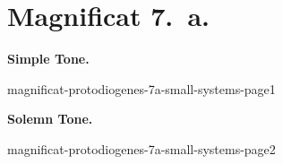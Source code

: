 {
\cleartoleftpage{}
\thispagestyle{empty}
\newcommand{\printsimpletone}{
\needspace{3\baselineskip}
\begin{center}\textbf{Simple Tone.}\end{center}
\vspace{0ex plus 0ex minus 2ex}
}
\newcommand{\printsolemntone}{
\needspace{3\baselineskip}
\begin{center}\textbf{Solemn Tone.}\end{center}
\vspace{0ex plus 0ex minus 1ex}
}

\label{magnificat-7a}
\vspace*{-\headheight}
\vspace*{-0.5\baselineskip}
\section{Magnificat 7.~a.}

\vspace{-\baselineskip}
\def\betweenLilyPondSystem#1{
  \ifnum#1>1
    \vfil\noindent
  \else
    \linebreak
  \fi
}
\newcommand{\includelilypond}[1]{
  \noindent
  {#1}
}
\def\magsolemn{F}
\def\magprotodiogenes{T}
\def\annot{\magtone.~\magend}
\def\greinitialformat#1{%
{\fontsize{50}{50}\selectfont #1}%
}
\printsimpletone{}
\begin{boldnummagnificat}{\magtex}
\magverses
\end{boldnummagnificat}


\vfill
\includelilypond{magnificat-protodiogenes-7a-small-systems-page1}
\pagebreak


\def\magsolemn{T}
\let\magant=\undefined
\let\magantlinetwo=\undefined
\let\magtex=\undefined
\let\magverses=\undefined
\def\magprotodiogenes{T}
\def\annot{\magtone.~\magend}
\printsolemntone{}
\begin{boldnummagnificat}{\magtex}
\magverses
\end{boldnummagnificat}


\vfill
\includelilypond{magnificat-protodiogenes-7a-small-systems-page2}
}